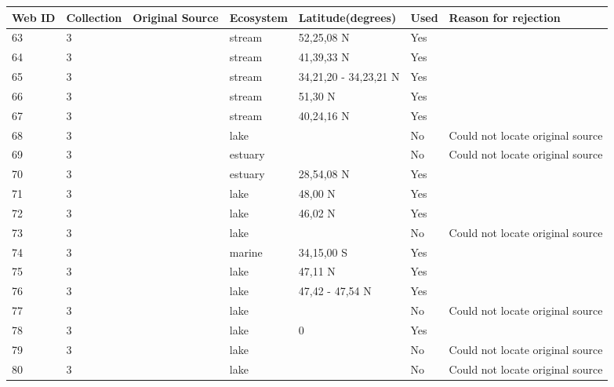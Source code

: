\documentclass[12pt]{article}
\begin{document}
\begin{landscape}
    \begin{table}[h!]
    \centering
    {\footnotesize
      \begin{tabular}{p{2.8cm}p{1.3cm}p{5.5cm}p{2.2cm}p{2.5cm}lp{3.5cm}}
        \hline
        Web ID & Collection & Original Source & Ecosystem & Latitude(degrees) & Used  & Reason for rejection  \\
        \hline
        63    & 3 & \cite{Jones1950}     & stream & 52,25,08 N & Yes   &       \\
        64    & 3 & \cite{Cummins1966}    & stream & 41,39,33 N & Yes   &       \\
        65    & 3 & \cite{Tsuda1972}  & stream & 34,21,20 - 34,23,21 N & Yes   &       \\
        66    & 3 & \cite{Mann1972a}  & stream & 51,30 N & Yes   &       \\
        67    & 3 & \cite{Carlson1968}    & stream & 40,24,16 N & Yes   &       \\
        68    & 3 & \cite{Morgan1972}  & lake &       & No    & Could not locate original source \\
        69    & 3 & \cite{Cohen1990}  & estuary &       & No    & Could not locate original source \\
        70    & 3 & \cite{Kemp1977}    & estuary & 28,54,08 N & Yes   &       \\
        71    & 3 & \cite{Sorokin1972}  & lake & 48,00 N & Yes   &       \\
        72    & 3 & \cite{Baril1983}  & lake & 46,02 N & Yes   &       \\
        73    & 3 & \cite{Schiemer1979}  & lake &       & No    & Could not locate original source \\
        74    & 3 & \cite{Cohen1990} & marine & 34,15,00 S & Yes   &       \\
        75    & 3 & \cite{Pechlaner1972}  & lake & 47,11 N & Yes   &       \\
        76    & 3 & \cite{Schiemer1979}  & lake & 47,42 - 47,54 N & Yes   &       \\
        77    & 3 & \cite{Cohen1990}  & lake &       & No    & Could not locate original source \\
        78    & 3 & \cite{Burgis1972}  & lake & 0     & Yes   &       \\
        79    & 3 & \cite{Sarvala1974}  & lake &       & No    & Could not locate original source \\
        80    & 3 & \cite{Sarvala1974}  & lake &       & No    & Could not locate original source \\

\end{tabular}}
\end{table}
\end{landscape}
\end{document}
